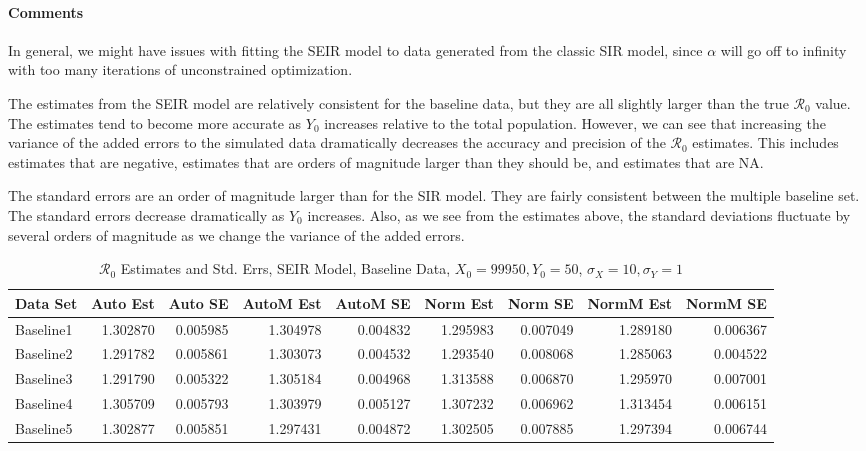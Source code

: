 \documentclass[12pt]{article}
\newcommand{\rr}{\ensuremath{\mathcal{R}_0}}
\begin{document}
\paragraph{Comments}

In general, we might have issues with fitting the SEIR model to data generated from the classic SIR model, since $\alpha$ will go off to infinity with too many iterations of unconstrained optimization. 

The estimates from the SEIR model are relatively consistent for the baseline data, but they are all slightly larger than the true $\rr$ value. The estimates tend to become more accurate as $Y_0$ increases relative to the total population. However, we can see that increasing the variance of the added errors to the simulated data dramatically decreases the accuracy and precision of the $\rr$ estimates. This includes estimates that are negative, estimates that are orders of magnitude larger than they should be, and estimates that are NA.

The standard errors are an order of magnitude larger than for the SIR model. They are fairly consistent between the multiple baseline set. The standard errors decrease dramatically as $Y_0$ increases. Also, as we see from the estimates above, the standard deviations fluctuate by several orders of magnitude as we change the variance of the added errors. 

\begin{table}[H]
	
	\caption{$\rr$ Estimates and Std. Errs, SEIR Model, 
		Baseline Data, $X_0 = 99950, Y_0 = 50$, 
		$\sigma_X = 10, \sigma_Y = 1$}
	\begin{footnotesize}
		\hskip -1cm
		\begin{tabular}{l|r|r|r|r|r|r|r|r}
			\hline
			Data Set & Auto Est & Auto SE & AutoM Est & AutoM SE & Norm Est & Norm SE & NormM Est & NormM SE\\
			\hline
			Baseline1 & 1.302870 & 0.005985 & 1.304978 & 0.004832 & 1.295983 & 0.007049 & 1.289180 & 0.006367\\
			\hline
			Baseline2 & 1.291782 & 0.005861 & 1.303073 & 0.004532 & 1.293540 & 0.008068 & 1.285063 & 0.004522\\
			\hline
			Baseline3 & 1.291790 & 0.005322 & 1.305184 & 0.004968 & 1.313588 & 0.006870 & 1.295970 & 0.007001\\
			\hline
			Baseline4 & 1.305709 & 0.005793 & 1.303979 & 0.005127 & 1.307232 & 0.006962 & 1.313454 & 0.006151\\
			\hline
			Baseline5 & 1.302877 & 0.005851 & 1.297431 & 0.004872 & 1.302505 & 0.007885 & 1.297394 & 0.006744\\
			\hline
		\end{tabular}
	\end{footnotesize}
\end{table}
\end{document}
